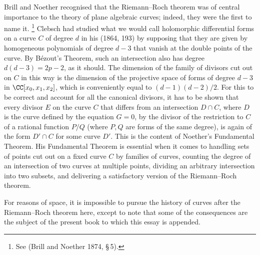 Brill and Noether recognised that the Riemann--Roch theorem was of
central importance to the theory of plane algebraic curves; indeed, they
were the first to name it.%
%
\footnote{See (Brill and Noether 1874, \S\,5).}
%
Clebsch had studied what we would call holomorphic diff\-erential forms
on a curve $C$  of degree $d$ in his (1864, 193)  by supposing that they
are given by homogeneous polynomials of degree $d-3$ that vanish at the
double points of the curve.
By B\'ezout's Theorem, such an intersection also has degree $d(d-3) =
2p-2$, as it should. The dimension of the family of divisors cut out
on $C$ in this way is the dimension of the projective space of forms
of degree $d-3$ in $\CC[x_0,x_1,x_2]$, which is conveniently equal to
$(d-1)(d-2)/2$. For this to be correct and account for all the canonical
divisors, it has to be shown that every divisor $E$ on the curve $C$ that
differs from an intersection $D\cap C$, where $D$ is the curve defined
by the equation $G = 0$,  by the divisor of the restriction to $C$ of
a rational function $P/Q$ (where $P, Q$ are forms of the same degree),
is again of the form $D'\cap C$ for some curve $D'$. This is the content
of Noether's Fundamental Theorem. His Fundamental Theorem is essential
when it comes  to handling  sets of points cut out on a fixed curve $C$ by
families of curves, counting the degree of an intersection of two curves
at multiple points,  dividing an arbitrary intersection into two subsets,
and delivering a satisfactory version of the Riemann--Roch theorem.

For reasons of space, it is impossible to pursue the history of curves
after the Riemann--Roch theorem here, except to note that some of the
consequences are the subject of the present book to which this essay
is appended.


\begingroup
